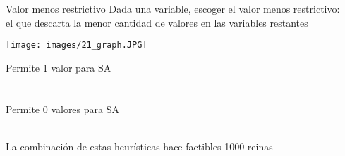 \begin{frame}{Valor menos restrictivo}
    Dada una variable, escoger el valor menos restrictivo:
    \\
    \qquad el que descarta la menor cantidad de valores en las variables restantes
    \\
    \noindent\begin{minipage}{0.6\textwidth}%
		\texttt{[image: images/21\_graph.JPG]}
	\end{minipage}%
	\hfill%
	\begin{minipage}{0.33\textwidth}\raggedright
		{\small
				Permite 1 valor para SA
				\\
				\quad
				\\
				\quad
				\\
				Permite 0 valores para SA
		}
	\end{minipage}
	\\
    La combinación de estas heurísticas hace factibles 1000 reinas
\end{frame}